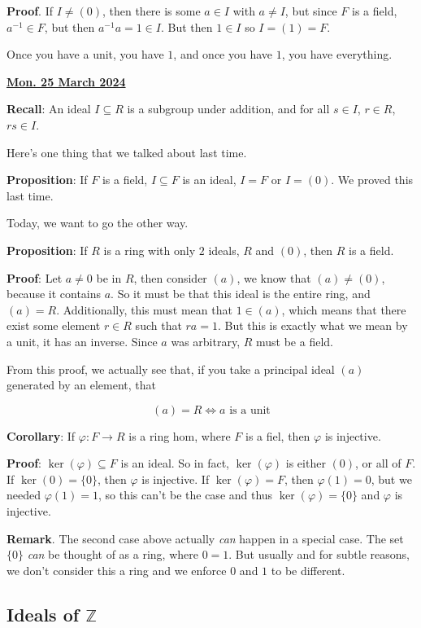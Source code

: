 \documentclass[12pt]{article}
\renewcommand{\date}[1]{\underline{\bf #1}}
\def\Z{{\mathbb Z}}
\theoremstyle{remark}
\theoremstyle{remark}
\theoremstyle{remark}
\theoremstyle{remark}
\theoremstyle{remark}
\begin{document}
{\bf Proof}. If $I \ne (0)$, then there is some $a \in I$ with $a \ne I$, but
since $F$ is a field, $a^{-1} \in F$, but then $a^{-1} a = 1 \in I$. But then $1
\in I$ so $I = (1) = F$.

Once you have a unit, you have $1$, and once you have $1$, you have everything.

\date{Mon. 25 March 2024}

{\bf Recall}: An ideal $I \subseteq R$ is a subgroup under addition, and for all
$s \in I$, $r \in R$, $rs \in I$.

Here's one thing that we talked about last time.

{\bf Proposition}: If $F$ is a field, $I \subseteq F$ is an ideal, $I = F$ or $I
= (0)$. We proved this last time.

Today, we want to go the other way.

{\bf Proposition}: If $R$ is a ring with only $2$ ideals, $R$ and $(0)$, then
$R$ is a field.

{\bf Proof}: Let $a \ne 0$ be in $R$, then consider $(a)$, we know that $(a) \ne
(0)$, because it contains $a$. So it must be that this ideal is the entire ring,
and $(a) = R$. Additionally, this must mean that $1 \in (a)$, which means that
there exist some element $r \in R$ such that $ra = 1$. But this is exactly what
we mean by a unit, it has an inverse. Since $a$ was arbitrary, $R$ must be a
field.

From this proof, we actually see that, if you take a principal ideal $(a)$
generated by an element, that

\[
  (a) = R \Leftrightarrow a \text{ is a unit}
\]

{\bf Corollary}: If $\varphi: F \to R$ is a ring hom, where $F$ is a fiel, then
$\varphi$ is injective.

{\bf Proof}: $\ker(\varphi) \subseteq F$ is an ideal. So in fact,
$\ker(\varphi)$ is either $(0)$, or all of $F$. If $\ker(0) = \{0\}$, then
$\varphi$ is injective. If $\ker(\varphi) = F$, then $\varphi(1) = 0$, but we
needed $\varphi(1) = 1$, so this can't be the case and thus $\ker(\varphi) =
\{0\}$ and $\varphi$ is injective.

{\bf Remark}. The second case above actually {\it can} happen in a special case.
The set $\{0\}$ {\it can} be thought of as a ring, where $0 = 1$. But usually
and for subtle reasons, we don't consider this a ring and we enforce $0$ and $1$
to be different.

\subsection{Ideals of $\Z$}
\end{document}
